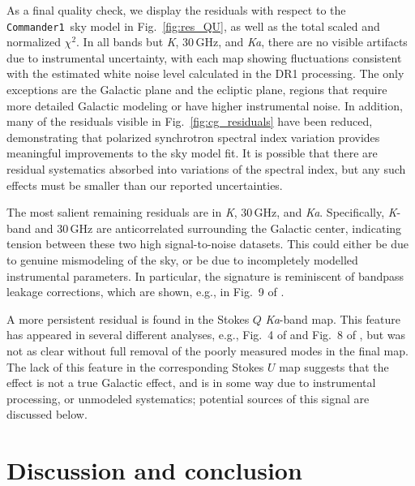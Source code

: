 \documentclass[twocolumn]{../../common/aa}
\def\commanderone{\texttt{Commander1}}
\newcommand{\K}[0]{\textit K}
\newcommand{\Ka}[0]{\textit{Ka}}
\begin{document}


As a final quality check, we display the residuals with respect to the \commanderone\ sky model in Fig.~\ref{fig:res_QU}, as well as the total scaled and normalized $\chi^2$. In all bands but \K, 30\,GHz, and \Ka, there are no visible artifacts due to instrumental uncertainty, with each map showing fluctuations consistent with the estimated white noise level calculated in the DR1 processing. The only exceptions are the Galactic plane and the ecliptic plane, regions that require more detailed Galactic modeling or have higher instrumental noise. In addition, many of the residuals visible in Fig.~\ref{fig:cg_residuals} have been reduced, demonstrating that polarized synchrotron spectral index variation provides meaningful improvements to the sky model fit. It is possible that there are residual systematics absorbed into variations of the spectral index, but any such effects must be smaller than our reported uncertainties.

The most salient remaining residuals are in \K, 30\,GHz, and \Ka. Specifically, \K-band and 30\,GHz are anticorrelated surrounding the Galactic center, indicating tension between these two high signal-to-noise datasets. This could either be due to genuine mismodeling of the sky, or be due to incompletely modelled instrumental parameters. In particular, the signature is reminiscent of bandpass leakage corrections, which are shown, e.g., in Fig.~9 of \citet{bp09}.

A more persistent residual is found in the Stokes $Q$ \Ka-band map. This feature has appeared in several different analyses, e.g., Fig.~4 of \citet{bp14} and Fig.~8 of \citet{weiland:2022}, but was not as clear without full removal of the poorly measured modes in the final map. The lack of this feature in the corresponding Stokes $U$ map suggests that the effect is not a true Galactic effect, and is in some way due to instrumental processing, or unmodeled systematics; potential sources of this signal are discussed below.






\section{Discussion and conclusion}
\label{sec:conclusion}
\end{document}
